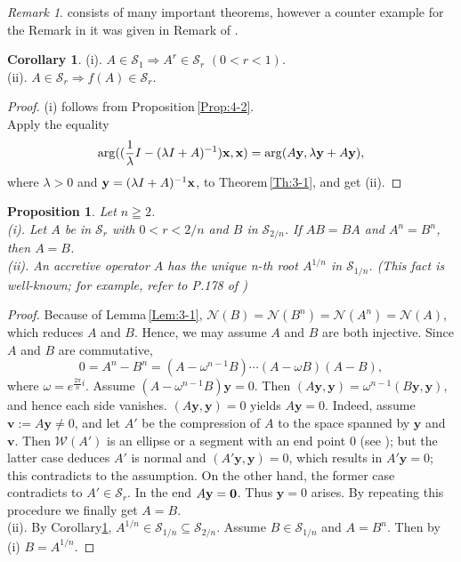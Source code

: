 \documentclass[reqno]{amsart}
\newtheorem{proposition}[theorem]{Proposition}
\theoremstyle{definition}
\newtheorem{corollary}[theorem]{Corollary}
\theoremstyle{remark}
\newtheorem{remark}[theorem]{Remark}
\begin{document}
\begin{remark}\rm
\cite{Kato} consists of many important theorems, however 
a counter example for the Remark in it was given in Remark of \cite{U-}. 
\end{remark}\par  

\begin{corollary}\label{Cor:4-1}\rm 
(i).  $A\in \mathcal{S}_{1} \Longrightarrow  A^r \in \mathcal{S}_{r}\,\, (0<r<1)$.\\ 
(ii).  $A\in \mathcal{S}_{r} \Longrightarrow  f(A)\in \mathcal{S}_{r}.$
\end{corollary}
\begin{proof} 
(i) follows from Proposition\,\ref{Prop:4-2}.\\
Apply the equality 
$$\arg ( (\frac{1}{\lambda}I  - (\lambda  I + A)^{-1}) {\bf x}, {\bf x}) =
\arg (A {\bf y}, \lambda {\bf y} + A {\bf y}),$$
where $\lambda >0$ and ${\bf y} = (\lambda I + A)^{-1}{\bf x}$,
 to Theorem\,\ref{Th:3-1}, and get (ii).
\end{proof}
\begin{proposition}\label{Prop:4-1} Let $n\geqq 2$.\\
{\rm (i)}. Let $A$ be in $\mathcal{S}_{r}$ with $0<r<2/n$ and $B$ in $\mathcal{S}_{2/n}$. If $AB=BA$ and $A^n =B^n$, then $A=B$.\\
{\rm (ii)}. An accretive operator $A$ has the unique  
n-th root $A^{1/n}$ in $\mathcal{S}_{1/n}$. (This fact is well-known; for example, 
 refer to P.178 of \cite{N-F})
\end{proposition}
\begin{proof}
Because of Lemma\,\ref{Lem:3-1}, $\mathcal{N}(B)= \mathcal{N}(B^n) 
=\mathcal{N}(A^n) = \mathcal{N}(A)$, which reduces $A$ and $B$. 
Hence, we may assume $A$ and $B$ are both injective. 
Since $A$ and $B$ are commutative, 
$$0= A^n - B^n = (A -\omega ^{n-1} B)\cdots (A - \omega B) 
 (A - B),$$
where $\omega = e^{\frac{2\pi}{n} i}$. 
Assume 
 $(A - \omega^{n-1} B) \mathbf{y} =0$. Then  
$(A \mathbf{y}, \mathbf{y}) = \omega^{n-1} (B \mathbf{y}, \mathbf{y}) $, and hence   
each side vanishes.  $(A \mathbf{y}, \mathbf{y}) =0$ yields $A \mathbf{y} = 0$. Indeed, 
assume  $\mathbf{v}\!:=A \mathbf{y} \ne 0$, and let  $A'$ be 
the compression of $A$ to the space spanned by 
$\mathbf{y}$ and $\mathbf{v}$. Then  $\mathcal{W}(A')$ is an ellipse 
or a segment with an end point $0$ (see \cite{D-1}); but the latter case deduces $A'$ is normal and $(A' \mathbf{y},  \mathbf{y}) =0$, which results in  
$A' \mathbf{y} = 0$; this contradicts to the assumption. On the other hand, 
the former case contradicts to $A' \in \mathcal{S}_{r}$.
In the end $A \mathbf{y} = {\bf 0}$. Thus
$\mathbf{y}= 0$ arises. By repeating 
this procedure we finally get $A = B$.\\
(ii). By Corollary\ref{Cor:4-1}, $A^{1/n} \in \mathcal{S}_{1/n}\subseteq \mathcal{S}_{2/n}$. 
Assume $B \in \mathcal{S}_{1/n}$ and $A=B^n$. Then by (i) 
$B= A^{1/n}$.
\end{proof}
\end{document}
